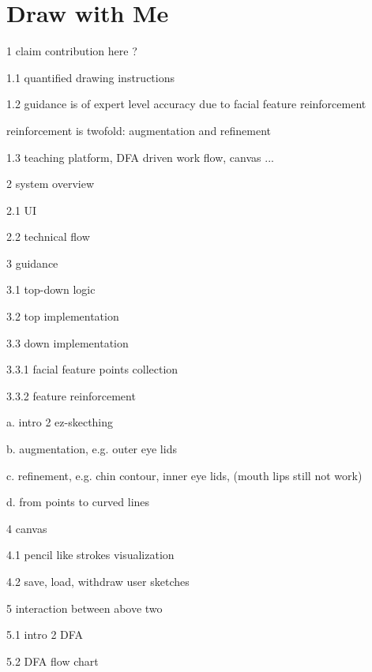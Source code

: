 \chapter{Draw with Me} \label{sec-mainwork}

1 claim contribution here ?
	
		1.1 quantified drawing instructions
	
		1.2 guidance is of expert level accuracy due to facial feature reinforcement
		
				reinforcement is twofold: augmentation and refinement
	
		1.3 teaching platform, DFA driven work flow, canvas ...

	
2 system overview
	
		2.1 UI
		
		2.2 technical flow


3 guidance
			
		3.1 top-down logic
			
		3.2 top implementation
						
		3.3 down implementation
			
				3.3.1 facial feature points collection
					
				3.3.2 feature reinforcement 
					
						a. intro 2 ez-skecthing
					
						b. augmentation, e.g. outer eye lids
					
						c. refinement, e.g. chin contour, inner eye lids, (mouth lips still not work)
							
						d. from points to curved lines

							
4 canvas
	
		4.1 pencil like strokes visualization
			
		4.2 save, load, withdraw user sketches


5 interaction between above two

		5.1	intro 2 DFA
		
		5.2	DFA flow chart 




